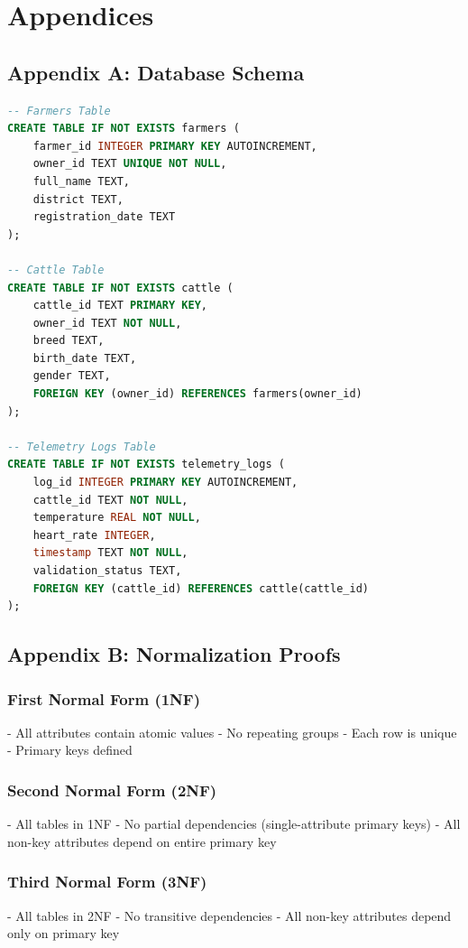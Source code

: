
\chapter*{Appendices}

\section*{Appendix A: Database Schema}

\begin{lstlisting}[language=SQL, caption=Complete Database Schema]
-- Farmers Table
CREATE TABLE IF NOT EXISTS farmers (
    farmer_id INTEGER PRIMARY KEY AUTOINCREMENT,
    owner_id TEXT UNIQUE NOT NULL,
    full_name TEXT,
    district TEXT,
    registration_date TEXT
);

-- Cattle Table
CREATE TABLE IF NOT EXISTS cattle (
    cattle_id TEXT PRIMARY KEY,
    owner_id TEXT NOT NULL,
    breed TEXT,
    birth_date TEXT,
    gender TEXT,
    FOREIGN KEY (owner_id) REFERENCES farmers(owner_id)
);

-- Telemetry Logs Table
CREATE TABLE IF NOT EXISTS telemetry_logs (
    log_id INTEGER PRIMARY KEY AUTOINCREMENT,
    cattle_id TEXT NOT NULL,
    temperature REAL NOT NULL,
    heart_rate INTEGER,
    timestamp TEXT NOT NULL,
    validation_status TEXT,
    FOREIGN KEY (cattle_id) REFERENCES cattle(cattle_id)
);
\end{lstlisting}

\section*{Appendix B: Normalization Proofs}

\subsection*{First Normal Form (1NF)}
- All attributes contain atomic values
- No repeating groups
- Each row is unique
- Primary keys defined

\subsection*{Second Normal Form (2NF)}
- All tables in 1NF
- No partial dependencies (single-attribute primary keys)
- All non-key attributes depend on entire primary key

\subsection*{Third Normal Form (3NF)}
- All tables in 2NF
- No transitive dependencies
- All non-key attributes depend only on primary key

